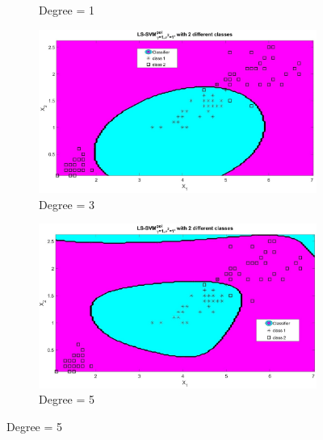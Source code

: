 {\begin{figure}[!htbp]
\begin{subfigure}{.33\textwidth}
 		\caption{Degree = 1}
 		\label{fig:deg(1)}
 	\end{subfigure}%
 	\begin{subfigure}{.33\textwidth}
 		\centering
 		\includegraphics[height=0.8\linewidth,width=1\linewidth]{Exercise1/Report/Ex1.3_deg(3).jpg}
 		\caption{Degree = 3}
 		\label{fig:deg31)}
 	\end{subfigure}%
 	\begin{subfigure}{.33\textwidth}
 		\centering
 		\includegraphics[height=0.8\linewidth,width=1\linewidth]{Exercise1/Report/Ex1.3_deg(5).jpg}
 		\caption{Degree = 5}
 		\label{fig:deg(5)}

\end{subfigure}
\end{figure}}
